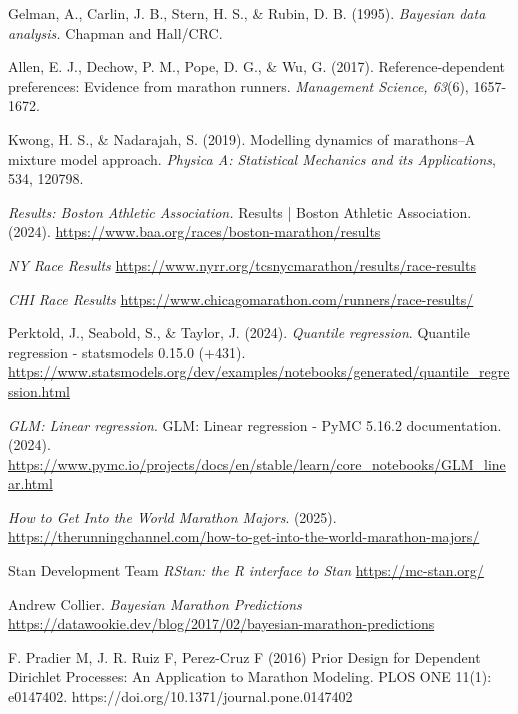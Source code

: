 \documentclass[USenglish,twocolumn]{article}
\theoremstyle{dgthm}
\theoremstyle{dgdef}
\begin{document}
\begin{thebibliography}{9}

Gelman, A., Carlin, J. B., Stern, H. S., \& Rubin, D. B. (1995). \emph{Bayesian data analysis.} Chapman and Hall/CRC.

Allen, E. J., Dechow, P. M., Pope, D. G., \& Wu, G. (2017). Reference-dependent preferences: Evidence from marathon runners. \emph{Management Science, 63}(6), 1657-1672.

Kwong, H. S., \& Nadarajah, S. (2019). Modelling dynamics of marathons–A mixture model approach. \emph{Physica A: Statistical Mechanics and its Applications}, 534, 120798.

\emph{Results: Boston Athletic Association.} Results | Boston Athletic Association. (2024). \url{https://www.baa.org/races/boston-marathon/results}

\emph{NY Race Results}  \url{https://www.nyrr.org/tcsnycmarathon/results/race-results}

\emph{CHI Race Results} \url{https://www.chicagomarathon.com/runners/race-results/}

Perktold, J., Seabold, S., \& Taylor, J. (2024). \emph{Quantile regression}. Quantile regression 
- statsmodels 0.15.0 (+431). \url{https://www.statsmodels.org/dev/examples/notebooks/generated/quantile_regression.html}

\emph{GLM: Linear regression}. GLM: Linear regression - PyMC 5.16.2 documentation. (2024). \url{https://www.pymc.io/projects/docs/en/stable/learn/core_notebooks/GLM_linear.html} 

\emph{How to Get Into the World Marathon Majors}.  (2025). \url{https://therunningchannel.com/how-to-get-into-the-world-marathon-majors/} 

Stan Development Team \emph{RStan: the R interface to Stan} \url{https://mc-stan.org/}

Andrew Collier. \emph{Bayesian Marathon Predictions} \url{https://datawookie.dev/blog/2017/02/bayesian-marathon-predictions}

F. Pradier M, J. R. Ruiz F, Perez-Cruz F (2016) Prior Design for Dependent Dirichlet Processes: An Application to Marathon Modeling. PLOS ONE 11(1): e0147402. https://doi.org/10.1371/journal.pone.0147402


\end{thebibliography}
\end{document}
